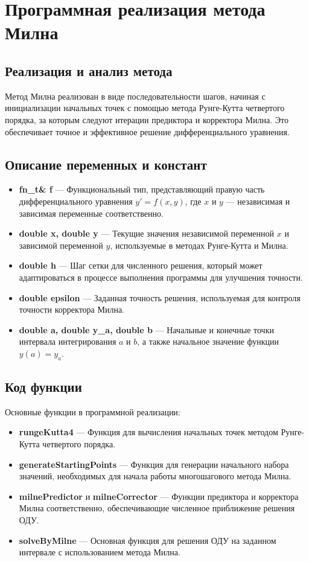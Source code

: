 \newpage
\section{Программная реализация метода Милна}

\subsection{Реализация и анализ метода}

Метод Милна реализован в виде последовательности шагов, начиная с инициализации начальных точек с помощью метода Рунге-Кутта четвертого порядка, за которым следуют итерации предиктора и корректора Милна. Это обеспечивает точное и эффективное решение дифференциального уравнения.

\subsection{Описание переменных и констант}

\begin{itemize}
    \item \textbf{fn\_t\& f} — Функциональный тип, представляющий правую часть дифференциального уравнения \( y' = f(x, y) \), где \( x \) и \( y \) — независимая и зависимая переменные соответственно.
    \item \textbf{double x, double y} — Текущие значения независимой переменной \( x \) и зависимой переменной \( y \), используемые в методах Рунге-Кутта и Милна.
    \item \textbf{double h} — Шаг сетки для численного решения, который может адаптироваться в процессе выполнения программы для улучшения точности.
    \item \textbf{double epsilon} — Заданная точность решения, используемая для контроля точности корректора Милна.
    \item \textbf{double a, double y\_a, double b} — Начальные и конечные точки интервала интегрирования \( a \) и \( b \), а также начальное значение функции \( y(a) = y_a \).
\end{itemize}

\subsection{Код функции}

Основные функции в программной реализации:

\begin{itemize}
    \item \textbf{rungeKutta4} — Функция для вычисления начальных точек методом Рунге-Кутта четвертого порядка.
    \item \textbf{generateStartingPoints} — Функция для генерации начального набора значений, необходимых для начала работы многошагового метода Милна.
    \item \textbf{milnePredictor} и \textbf{milneCorrector} — Функции предиктора и корректора Милна соответственно, обеспечивающие численное приближение решения ОДУ.
    \item \textbf{solveByMilne} — Основная функция для решения ОДУ на заданном интервале с использованием метода Милна.
\end{itemize}

